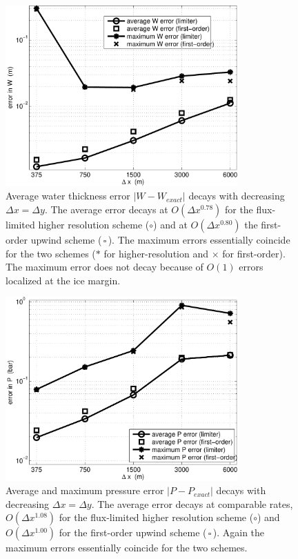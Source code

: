 \documentclass[11pt,final]{amsart}%
\begin{document}
\begin{figure}[ht]
\includegraphics[width=3.5in,keepaspectratio=true]{refineW}
\caption{Average water thickness error $|W-W_{exact}|$ decays with decreasing $\Delta x = \Delta y$.  The average error decays at $O(\Delta x^{0.78})$ for the flux-limited higher resolution scheme (\Large$\circ$\normalsize) and at $O(\Delta x^{0.80})$ the first-order upwind scheme (\scriptsize\,$\square$\,\normalsize).  The maximum errors essentially coincide for the two schemes (\large$\ast$ \normalsize for higher-resolution and $\times$ for first-order).  The maximum error does not decay because of $O(1)$ errors localized at the ice margin.}
\label{fig:refineW}
\end{figure}

\begin{figure}[ht]
\includegraphics[width=3.5in,keepaspectratio=true]{refineP}
\caption{Average and maximum pressure error $|P-P_{exact}|$ decays with decreasing $\Delta x = \Delta y$.  The average error decays at comparable rates, $O(\Delta x^{1.08})$ for the flux-limited higher resolution scheme (\Large$\circ$\normalsize) and $O(\Delta x^{1.00})$ for the first-order upwind scheme (\scriptsize\,$\square$\,\normalsize).  Again the maximum errors essentially coincide for the two schemes.}
\label{fig:refineP}
\end{figure}
\end{document}
